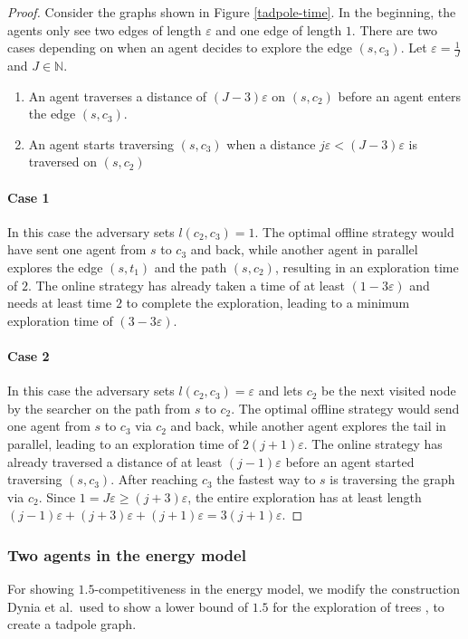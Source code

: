 \begin{proof}
    Consider the graphs shown in Figure \ref{tadpole-time}. In the beginning, the agents only see two edges of length $\varepsilon$ and one edge of length $1$. There are two cases depending on when an agent decides to 
    explore the edge $(s,c_3)$. Let $\varepsilon=\frac{1}{J}$ and $J \in \mathbb{N}$.
    \begin{enumerate}
        \item An agent traverses a distance of $(J-3)\varepsilon$ on $(s,c_2)$ before an agent enters the edge $(s,c_3)$.
        \item An agent starts traversing $(s,c_3)$ when a distance $j\varepsilon<(J-3)\varepsilon$ is traversed on $(s,c_2)$
    \end{enumerate}
    \paragraph*{Case 1} In this case the adversary sets $l(c_2, c_3)=1$. The optimal offline strategy would have sent one agent from $s$ to $c_3$ and back, while another agent in parallel explores the edge
    $(s,t_1)$ and the path $(s,c_2)$, resulting in an exploration time of $2$. The online strategy has already taken a time of at least $(1-3\varepsilon)$ and needs at least time $2$ to complete the exploration,
    leading to a minimum exploration time of $(3-3\varepsilon)$.
    \paragraph*{Case 2} In this case the adversary sets $l(c_2, c_3)=\varepsilon$ and lets $c_2$ be the next visited node by the searcher on the path from $s$ to $c_2$. 
    The optimal offline strategy would send one agent from $s$ to $c_3$ via $c_2$ and back, while another agent explores the tail in parallel, leading to an exploration time of $2(j+1)\varepsilon$. The online strategy
    has already traversed a distance of at least $(j-1)\varepsilon$ before an agent started traversing $(s,c_3)$. After reaching $c_3$ the fastest way to $s$ is traversing the graph via $c_2$. Since
    $1=J\varepsilon\geq (j+3)\varepsilon$, the entire exploration
    has at least length $(j-1)\varepsilon + (j+3)\varepsilon + (j+1)\varepsilon = 3(j+1)\varepsilon$.
\end{proof}
\subsubsection*{Two agents in the energy model} For showing $1.5$-competitiveness in the energy model, we modify the construction Dynia et al.\ used to show a lower bound of $1.5$ for the exploration
of trees \cite{Dynia2006}, to create a tadpole graph.

